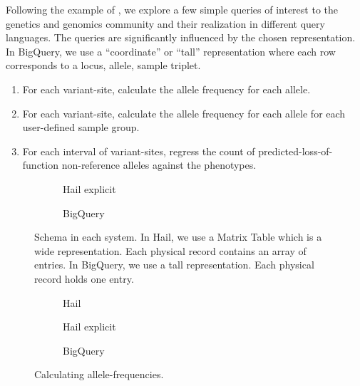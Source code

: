 \documentclass[10pt,a4paper%
]{article}
\begin{document}
Following the example of \cite{evaluating-query-languages-and-systems-for-hep}, we explore a few
simple queries of interest to the genetics and genomics community and their realization in different
query languages. The queries are significantly influenced by the chosen representation. In BigQuery,
we use a ``coordinate'' or ``tall'' representation where each row corresponds to a locus, allele,
sample triplet.

\begin{enumerate}
\item For each variant-site, calculate the allele frequency for each allele.
\item For each variant-site, calculate the allele frequency for each allele for each user-defined
  sample group.
\item For each interval of variant-sites, regress the count of predicted-loss-of-function
  non-reference alleles against the phenotypes.
\end{enumerate}

\begin{figure}[h]
  \begin{subfigure}[h]{\textwidth}
    
    \caption{Hail explicit}
    \label{fig:query-example-schema-hail}
  \end{subfigure}

  \begin{subfigure}[h]{\textwidth}
    
    \caption{BigQuery}
    \label{fig:query-example-schema-bigquery}
  \end{subfigure}
  \caption{Schema in each system. In Hail, we use a Matrix Table which is a wide
    representation. Each physical record contains an array of entries. In BigQuery, we use a tall
    representation. Each physical record holds one entry.}
  \label{fig:query-example-schema}
\end{figure}

\begin{figure}[h]
  \begin{subfigure}[h]{\textwidth}
    
    \caption{Hail}
    \label{fig:query-example-one-hail-builtin}
  \end{subfigure}

  \begin{subfigure}[h]{\textwidth}
    
    \caption{Hail explicit}
    \label{fig:query-example-one-hail}
  \end{subfigure}

  \begin{subfigure}[h]{\textwidth}
    
    \caption{BigQuery}
    \label{fig:query-example-one-bigquery}
  \end{subfigure}
  \caption{Calculating allele-frequencies.}
  \label{fig:query-example-one}
\end{figure}
\end{document}
